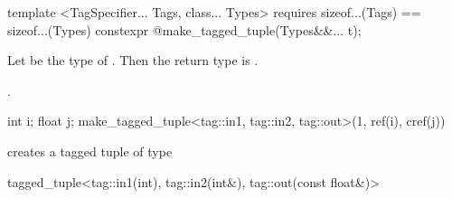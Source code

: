 %
%
\begin{itemdecl}
template <TagSpecifier... Tags, class... Types>
  requires sizeof...(Tags) == sizeof...(Types)
    constexpr @\seebelow@ make_tagged_tuple(Types&&... t);
\end{itemdecl}

\begin{itemdescr}
\pnum
Let  be the type of .
Then the return type is .

\pnum
\returns {}.

\pnum
\enterexample

\begin{codeblock}
int i; float j;
make_tagged_tuple<tag::in1, tag::in2, tag::out>(1, ref(i), cref(j))
\end{codeblock}

creates a tagged tuple of type

\begin{codeblock}
tagged_tuple<tag::in1(int), tag::in2(int&), tag::out(const float&)>
\end{codeblock}
\exitexample
\end{itemdescr}
